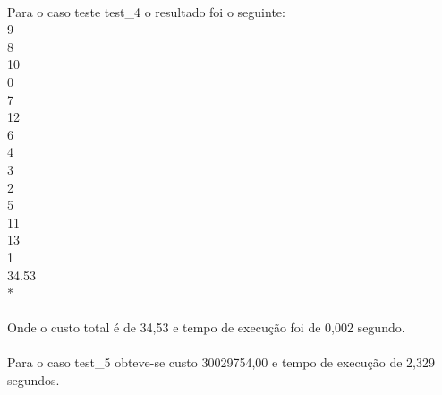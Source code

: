 \documentclass[12pt,a4paper]{article}
\begin{document}
 {\paragraph{} Para o caso teste test\_4 o resultado foi o seguinte:\\9\\8\\10\\0\\7\\12\\6\\4\\3\\2\\5\\11\\13\\1\\34.53\\{*}}
 {\paragraph{} Onde o custo total é de 34,53 e tempo de execução foi de 0,002 segundo.}
 {\paragraph{} Para o caso test\_5 obteve-se custo 30029754,00 e tempo de execução de 2,329 segundos.}
 
 \newpage
\end{document}
